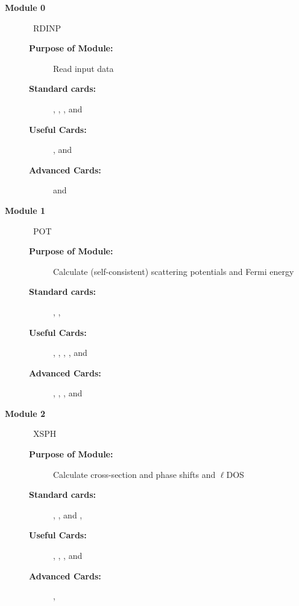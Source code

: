 \documentclass[11pt,oneside]{report} %
\begin{document}
\begin{description}
\item[\large\textbf{Module 0}]\dotfill\  {\large\textrm{RDINP}}
  \begin{description}
  \item[\textbf{Purpose of Module:}] Read input data
  \item[\textbf{Standard cards:}] ,
    , , and
  \item[\textbf{Useful Cards:}] ,
    and 
  \item[\textbf{Advanced Cards:}]  and
  \end{description}
\item[\large\textbf{Module 1}]\dotfill\  {\large\textrm{POT}}
  \begin{description}
  \item[\textbf{Purpose of Module:}] Calculate (self-consistent)
    scattering potentials and Fermi energy
  \item[\textbf{Standard cards:}] ,
    , 
  \item[\textbf{Useful Cards:}] ,
    , ,
    , and  
  \item[\textbf{Advanced Cards:}] ,
    ,
    , and 
  \end{description}
\item[\large\textbf{Module 2}]\dotfill\  {\large\textrm{XSPH}}
  \begin{description}
  \item[\textbf{Purpose of Module:}] Calculate cross-section and phase
    shifts and $\ell$DOS
  \item[\textbf{Standard cards:}] ,
    ,  and
    ,
  \item[\textbf{Useful Cards:}] ,
    , ,
     and 
  \item[\textbf{Advanced Cards:}] ,

\end{description}
\end{description}
\end{document}
